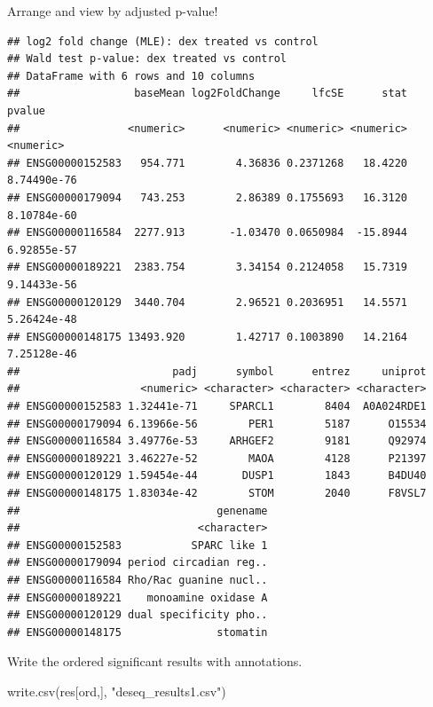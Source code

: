 \documentclass[
]{article}
\newenvironment{Shaded}{\begin{snugshade}}{\end{snugshade}}
\newcommand{\FunctionTok}[1]{\textcolor[rgb]{0.00,0.00,0.00}{#1}}
\newcommand{\NormalTok}[1]{#1}
\newcommand{\OtherTok}[1]{\textcolor[rgb]{0.56,0.35,0.01}{#1}}
\newcommand{\SpecialCharTok}[1]{\textcolor[rgb]{0.00,0.00,0.00}{#1}}
\newcommand{\StringTok}[1]{\textcolor[rgb]{0.31,0.60,0.02}{#1}}
\begin{document}
Arrange and view by adjusted p-value!

\begin{Shaded}
\end{Shaded}

\begin{verbatim}
## log2 fold change (MLE): dex treated vs control 
## Wald test p-value: dex treated vs control 
## DataFrame with 6 rows and 10 columns
##                  baseMean log2FoldChange     lfcSE      stat      pvalue
##                 <numeric>      <numeric> <numeric> <numeric>   <numeric>
## ENSG00000152583   954.771        4.36836 0.2371268   18.4220 8.74490e-76
## ENSG00000179094   743.253        2.86389 0.1755693   16.3120 8.10784e-60
## ENSG00000116584  2277.913       -1.03470 0.0650984  -15.8944 6.92855e-57
## ENSG00000189221  2383.754        3.34154 0.2124058   15.7319 9.14433e-56
## ENSG00000120129  3440.704        2.96521 0.2036951   14.5571 5.26424e-48
## ENSG00000148175 13493.920        1.42717 0.1003890   14.2164 7.25128e-46
##                        padj      symbol      entrez     uniprot
##                   <numeric> <character> <character> <character>
## ENSG00000152583 1.32441e-71     SPARCL1        8404  A0A024RDE1
## ENSG00000179094 6.13966e-56        PER1        5187      O15534
## ENSG00000116584 3.49776e-53     ARHGEF2        9181      Q92974
## ENSG00000189221 3.46227e-52        MAOA        4128      P21397
## ENSG00000120129 1.59454e-44       DUSP1        1843      B4DU40
## ENSG00000148175 1.83034e-42        STOM        2040      F8VSL7
##                               genename
##                            <character>
## ENSG00000152583           SPARC like 1
## ENSG00000179094 period circadian reg..
## ENSG00000116584 Rho/Rac guanine nucl..
## ENSG00000189221    monoamine oxidase A
## ENSG00000120129 dual specificity pho..
## ENSG00000148175               stomatin
\end{verbatim}

Write the ordered significant results with annotations.

\begin{Shaded}
\begin{Highlighting}[]
\FunctionTok{write.csv}\NormalTok{(res[ord,], }\StringTok{"deseq\_results1.csv"}\NormalTok{)}
\end{Highlighting}
\end{Shaded}
\end{document}
